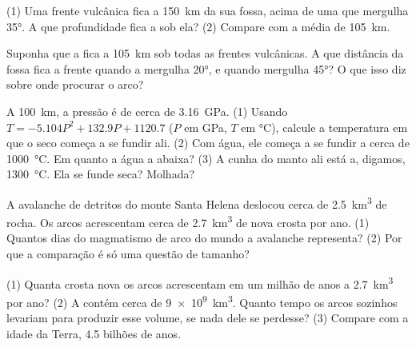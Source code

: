 \begin{exercise}[$\star\star$]\label{exo:g12:subduction-magmatism:6}
(1) Uma frente vulcânica fica a \qty{150}{km} da sua fossa, acima de uma
 que mergulha \ang{35}. A que profundidade fica a  sob ela?
(2) Compare com a média de \qty{105}{km}.
\end{exercise}

\begin{exercise}[$\star\star$]\label{exo:g12:subduction-magmatism:7}
Suponha que a  fica a \qty{105}{km} sob todas as frentes vulcânicas. A
que distância da fossa fica a frente quando a  mergulha \ang{20}, e
quando mergulha \ang{45}? O que isso diz sobre onde procurar o arco?
\end{exercise}

\begin{exercise}[$\star\star$]\label{exo:g12:subduction-magmatism:8}
A \qty{100}{km}, a pressão é de cerca de \qty{3.16}{GPa}. (1) Usando $T =
-5.104P^2 + 132.9P + 1120.7$ ($P$ em \unit{GPa}, $T$ em \unit{\celsius}),
calcule a temperatura em que o  seco começa a se fundir ali.
(2) Com água, ele começa a se fundir a cerca de \qty{1000}{\celsius}. Em
quanto a água a abaixa? (3) A cunha do manto ali está a, digamos,
\qty{1300}{\celsius}. Ela se funde seca? Molhada?
\end{exercise}

\begin{exercise}[$\star\star$]\label{exo:g12:subduction-magmatism:9}
A avalanche de detritos do monte Santa Helena deslocou cerca de
\qty{2.5}{km^3} de rocha. Os arcos acrescentam cerca de \qty{2.7}{km^3} de
nova crosta por ano. (1) Quantos dias do magmatismo de arco do mundo a
avalanche representa? (2) Por que a comparação é só uma questão de
tamanho?
\end{exercise}

\begin{exercise}[$\star\star$]\label{exo:g12:subduction-magmatism:10}
(1) Quanta crosta nova os arcos acrescentam em um milhão de anos a
\qty{2.7}{km^3} por ano? (2) A  contém cerca de
\qty{9e9}{km^3}. Quanto tempo os arcos sozinhos levariam para produzir esse
volume, se nada dele se perdesse? (3) Compare com a idade da Terra, 4.5
bilhões de anos.
\end{exercise}


